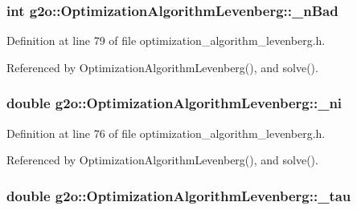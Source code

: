 \subsubsection[{\texorpdfstring{\+\_\+n\+Bad}{_nBad}}]{\setlength{\rightskip}{0pt plus 5cm}int g2o\+::\+Optimization\+Algorithm\+Levenberg\+::\+\_\+n\+Bad\hspace{0.3cm}{\ttfamily [protected]}}\hypertarget{classg2o_1_1OptimizationAlgorithmLevenberg_a7f0b375c45a9f91f2676548591273c8d}{}\label{classg2o_1_1OptimizationAlgorithmLevenberg_a7f0b375c45a9f91f2676548591273c8d}


Definition at line 79 of file optimization\+\_\+algorithm\+\_\+levenberg.\+h.



Referenced by Optimization\+Algorithm\+Levenberg(), and solve().

\subsubsection[{\texorpdfstring{\+\_\+ni}{_ni}}]{\setlength{\rightskip}{0pt plus 5cm}double g2o\+::\+Optimization\+Algorithm\+Levenberg\+::\+\_\+ni\hspace{0.3cm}{\ttfamily [protected]}}\hypertarget{classg2o_1_1OptimizationAlgorithmLevenberg_a8bcb1a957056cba788072992c5a8a7a1}{}\label{classg2o_1_1OptimizationAlgorithmLevenberg_a8bcb1a957056cba788072992c5a8a7a1}


Definition at line 76 of file optimization\+\_\+algorithm\+\_\+levenberg.\+h.



Referenced by Optimization\+Algorithm\+Levenberg(), and solve().

\subsubsection[{\texorpdfstring{\+\_\+tau}{_tau}}]{\setlength{\rightskip}{0pt plus 5cm}double g2o\+::\+Optimization\+Algorithm\+Levenberg\+::\+\_\+tau\hspace{0.3cm}{\ttfamily [protected]}}\hypertarget{classg2o_1_1OptimizationAlgorithmLevenberg_ac09602f23e52c5dbc6be1bf77e9f9d5f}{}\label{classg2o_1_1OptimizationAlgorithmLevenberg_ac09602f23e52c5dbc6be1bf77e9f9d5f}


